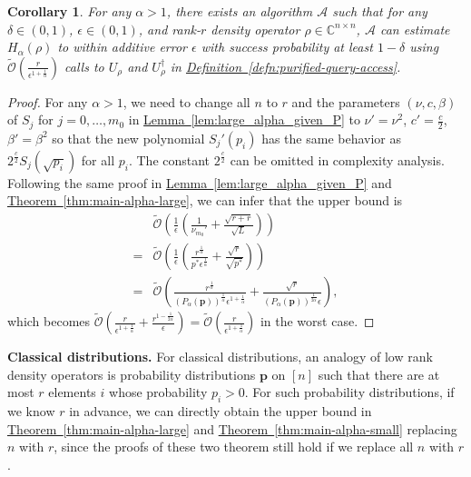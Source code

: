 \documentclass[journal]{IEEEtran}
\newtheorem{corollary}{Corollary}
\newcommand{\thm}[1]{\hyperref[thm:#1]{Theorem~\ref*{thm:#1}}}
\newcommand{\defn}[1]{\hyperref[defn:#1]{Definition~\ref*{defn:#1}}}
\newcommand{\lem}[1]{\hyperref[lem:#1]{Lemma~\ref*{lem:#1}}}
\begin{document}
\begin{corollary}
  \label{cor:low-rank-large-alpha}
For any $\alpha > 1$, there exists an algorithm $\mathcal{A}$ such that for any $\delta \in (0,1)$, $\epsilon\in(0,1)$, and rank-$r$ density operator $\rho\in \mathbb{C}^{n\times n}$, $\mathcal{A}$ can estimate $H_{\alpha}(\rho)$ to within additive error $\epsilon$
  with success probability at least $1-\delta$ using $\widetilde{\mathcal{O}}\left(\frac{r}{\epsilon^{1+\frac{1}{\alpha}}} \right)$ calls to $U_{\rho}$ and $U_{\rho}^{\dagger}$ in \defn{purified-query-access}.
\end{corollary}
\begin{proof}
For any $\alpha > 1$, we need to change all $n$ to $r$ and the parameters $(\nu,c,\beta)$ of $S_j$ for $j=0,\ldots,m_0$ in \lem{large_alpha_given_P} to $\nu' = \nu^2$, $c' = \frac{c}{2}$, $\beta' = \beta^2$ so that the new polynomial $S_j'(p_i)$ has the same behavior as $2^{\frac{c}{2}}S_j(\sqrt{p_i})$ for all $p_i$. The constant $2^{\frac{c}{2}}$ can be omitted in complexity analysis. Following the same proof in \lem{large_alpha_given_P} and \thm{main-alpha-large}, we can infer that the upper bound is 
\begin{align}
  &\widetilde{\mathcal{O}}\left(\frac{1}{\epsilon}\left(\frac{1}{\nu_{m_0}'} + \frac{\sqrt{r + r}}{\sqrt{L}}\right)\right) \nonumber \\
  = & \widetilde{\mathcal{O}}\left(\frac{1}{\epsilon}\left(\frac{r^{\frac{1}{\alpha}}}{p^*\epsilon^{\frac{1}{\alpha}}} + \frac{\sqrt{r}}{\sqrt{p^*}}\right)\right) \nonumber \\
  = & \widetilde{\mathcal{O}}\left(\frac{r^{\frac{1}{\alpha}}}{(P_{\alpha}(\mathbf{p}))^{\frac{1}{\alpha}}\epsilon^{1+\frac{1}{\alpha}}}+\frac{\sqrt{r}}{(P_{\alpha}(\mathbf{p}))^{\frac{1}{2\alpha}}\epsilon}\right),
\end{align}
which becomes $\widetilde{\mathcal{O}}\left(\frac{r}{\epsilon^{1+\frac{1}{\alpha}}} + \frac{r^{1-\frac{1}{2\alpha}}}{\epsilon}\right) = \widetilde{\mathcal{O}}\left(\frac{r}{\epsilon^{1+\frac{1}{\alpha}}} \right)$ in the worst case. 
\end{proof}

\vspace{3mm}
\noindent
\textbf{Classical distributions.}
For classical distributions, an analogy of low rank density operators is probability distributions $\mathbf{p}$ on $[n]$ such that there are at most $r$ elements $i$ whose probability $p_i > 0$. 
For such probability distributions, if we know $r$ in advance, we can directly obtain the upper bound in \thm{main-alpha-large} and \thm{main-alpha-small} replacing $n$ with $r$, since the proofs of these two theorem still hold if we replace all $n$ with $r$.
\end{document}

